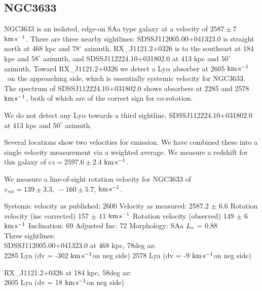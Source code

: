 \documentclass[iop]{emulateapj-rtx4}
\newcommand{\kms}{$\rm km\, s^{-1}$}
\begin{document}
%



\subsection{NGC3633}
NGC3633 is an isolated, edge-on SAa type galaxy at a velocity of $2587 \pm 7$ \kms. There are three nearby sightlines: SDSSJ112005.00+041323.0 is straight north at 468 kpc and $78^{\circ}$ azimuth, RX\_J1121.2+0326 is to the southeast at 184 kpc and $58^{\circ}$ azimuth, and SDSSJ112224.10+031802.0 at 413 kpc and $50^{\circ}$ azimuth. Toward RX\_J1121.2+0326 we detect a Ly$\alpha$ absorber at 2605 \kms~on the approaching side, which is essentially systemic velocity for NGC3633. The spectrum of SDSSJ112224.10+031802.0 shows absorbers at 2285 and 2578 \kms, both of which are of the correct sign for co-rotation.

We do not detect any Ly$\alpha$ towards a third sightline, SDSSJ112224.10+031802.0 at 413 kpc and $50^{\circ}$ azimuth.

Several locations show two velocities for emission. We have combined these into a single velocity measurement via a weighted average. We measure a redshift for this galaxy of $cz = 2597.6 \pm 2.4$ \kms. 

We measure a line-of-sight rotation velocity for NGC3633 of $v_{rot}=139\pm 3.3,~-160\pm5.7$,  \kms.


Systemic velocity as published: 2600
Velocity as measured: 2587.2 $\pm$ 6.6
Rotation velocity (inc corrected) 157 $\pm$ 11 \kms
Rotation velocity (observed) 149 $\pm$ 6 \kms
Inclination: 69
Adjusted Inc: 72
Morphology: SAa
$L_{\**}$ = 0.88 \\

Three sightlines: \\
SDSSJ112005.00+041323.0 at 468 kpc, 78deg az: \\
2285 Lya (dv = -302 \kms on neg side)
2578 Lya (dv = -9 \kms on neg side)


RX\_J1121.2+0326 at 184 kpc, 58deg az: \\
2605 Lya (dv = 18 \kms on neg side)
\end{document}
